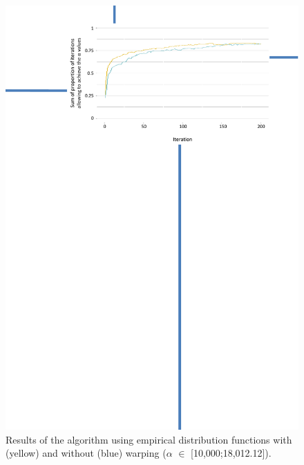

\begin{figure}[!ht]
	\centering
	\includegraphics[trim = 4cm 18.5cm 1.9cm 1.4cm, clip, width=\textwidth]{Figures_Warping_resultats_courbes_algoCoco_10000_18000.pdf}
	\caption{Results of the  algorithm using empirical distribution functions \cite{hansen2010} with (yellow) and without (blue) warping ($\alpha$ $\in$ [10,000;18,012.12]).}\label{fig:algococo10000}
\end{figure}

